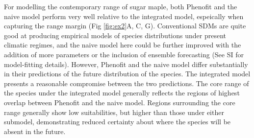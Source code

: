 For modelling the contemporary range of sugar maple, both Phenofit and the naive model perform very well relative to the integrated model, espeically when capturing the range margin (Fig \ref{fig:ex2}A, C, G).
Conventional SDMs are quite good at producing empirical models of species distributions under present climatic regimes, and the naive model here could be further improved with the addition of more parameters or the inclusion of ensemble forecasting (See SI for model-fitting details).
However, Phenofit and the naive model differ substantially in their predictions of the future distribution of the species.
The integrated model presents a reasonable compromise between the two predictions. 
The core range of the species under the integrated model generally reflects the regions of highest overlap between Phenofit and the naive model.
Regions surrounding the core range generally show low suitabilities, but higher than those under either submodel, demonstrating reduced certainty about where the species will be absent in the future.


